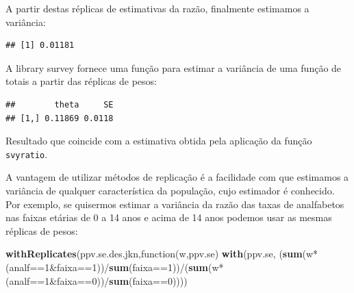 \documentclass[]{book}
\newenvironment{Shaded}{\begin{snugshade}}{\end{snugshade}}
\newcommand{\KeywordTok}[1]{\textcolor[rgb]{0.13,0.29,0.53}{\textbf{{#1}}}}
\newcommand{\DecValTok}[1]{\textcolor[rgb]{0.00,0.00,0.81}{{#1}}}
\newcommand{\StringTok}[1]{\textcolor[rgb]{0.31,0.60,0.02}{{#1}}}
\newcommand{\NormalTok}[1]{{#1}}
\numberwithin{example}{chapter}
\numberwithin{remark}{chapter}
\numberwithin{definition}{chapter}
\begin{document}
A partir destas réplicas de estimativas da razão, finalmente estimamos a
variância:

\begin{Shaded}
\end{Shaded}

\begin{verbatim}
## [1] 0.01181
\end{verbatim}

A library survey fornece uma função para estimar a variância de uma
função de totais a partir das réplicas de pesos:

\begin{Shaded}
\end{Shaded}

\begin{verbatim}
##        theta     SE
## [1,] 0.11869 0.0118
\end{verbatim}

Resultado que coincide com a estimativa obtida pela aplicação da função
\texttt{svyratio}.

A vantagem de utilizar métodos de replicação é a facilidade com que
estimamos a variância de qualquer característica da população, cujo
estimador é conhecido. Por exemplo, se quisermos estimar a variância da
razão das taxas de analfabetos nas faixas etárias de 0 a 14 anos e acima
de 14 anos podemos usar as mesmas réplicas de pesos:

\begin{Shaded}
\begin{Highlighting}[]
\KeywordTok{withReplicates}\NormalTok{(ppv.se.des.jkn,function(w,ppv.se) }\KeywordTok{with}\NormalTok{(ppv.se,}
\NormalTok{(}\KeywordTok{sum}\NormalTok{(w*(analf==}\DecValTok{1}\NormalTok{&faixa==}\DecValTok{1}\NormalTok{))/}\KeywordTok{sum}\NormalTok{(faixa==}\DecValTok{1}\NormalTok{))/(}\KeywordTok{sum}\NormalTok{(w*(analf==}\DecValTok{1}\NormalTok{&faixa==}\DecValTok{0}\NormalTok{))/}\KeywordTok{sum}\NormalTok{(faixa==}\DecValTok{0}\NormalTok{))))}
\end{Highlighting}
\end{Shaded}
\end{document}
